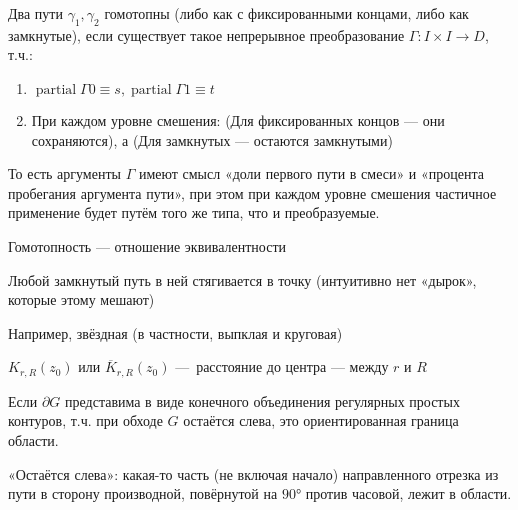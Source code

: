 \documentclass[12pt, a4paper, oneside]{memoir}
\begin{document}
\begin{definition}
    Два пути $\gamma_1, \gamma_2$ гомотопны (либо как с фиксированными концами, либо как замкнутые), 
    если существует такое непрерывное преобразование $\Gamma: I × I → D$, т.ч.:

    \begin{enumerate}
        \item $\operatorname{partial} \Gamma 0 \equiv s, \operatorname{partial} \Gamma 1 \equiv t$
        \item При каждом уровне смешения: (Для фиксированных концов — они сохраняются), 
        а (Для замкнутых — остаются замкнутыми)
    \end{enumerate}
\end{definition}

\begin{remark}
    То есть аргументы $\Gamma$ имеют смысл «доли первого пути в смеси» и «процента пробегания аргумента пути»,
    при этом при каждом уровне смешения частичное применение будет путём того же типа, что и преобразуемые.
\end{remark}

\begin{remark}
    Гомотопность — отношение эквивалентности
\end{remark}

\begin{definition}

    Любой замкнутый путь в ней стягивается в точку (интуитивно нет «дырок», которые этому мешают)
\end{definition}

\begin{example}
    Например, звёздная (в частности, выпклая и круговая)
\end{example}

\begin{definition}

    $K_{r, R}(z_0)$ или $\overline{K}_{r, R}(z_0)$ — расстояние до центра — между $r$ и $R$
\end{definition}


\begin{definition}

    Если $\partial G$ представима в виде конечного объединения регулярных простых контуров, 
    т.ч. при обходе $G$ остаётся слева, это ориентированная граница области.

    «Остаётся слева»: какая-то часть (не включая начало) направленного отрезка из пути в сторону производной, 
    повёрнутой на $90°$ против часовой, лежит в области.
\end{definition}
\end{document}
